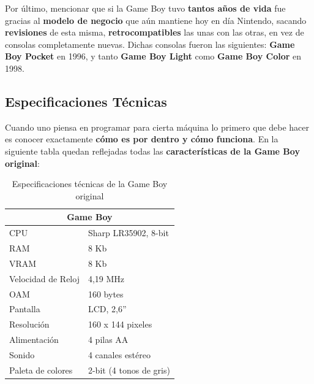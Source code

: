 Por último, mencionar que si la Game Boy tuvo \textbf{tantos años de vida} fue gracias al \textbf{modelo de negocio} que aún mantiene hoy en día Nintendo, sacando \textbf{revisiones} de esta misma, \textbf{retrocompatibles} las unas con las otras, en vez de consolas completamente nuevas. Dichas consolas fueron las siguientes: \textbf{Game Boy Pocket} en 1996, y tanto \textbf{Game Boy Light} como \textbf{Game Boy Color} en 1998.

\subsection{Especificaciones Técnicas}

Cuando uno piensa en programar para cierta máquina lo primero que debe hacer es conocer exactamente \textbf{cómo es por dentro y cómo funciona}. En la siguiente tabla quedan reflejadas todas las \textbf{características de la Game Boy original}:

\begin{table}[h!]
\centering
\begin{tabular}{ |p{3.5cm}|p{3.5cm}| }

\hline

\multicolumn{2}{|c|}{\textbf{Game Boy}}             \\ \hline
CPU                & Sharp LR35902, 8-bit           \\ \hline
RAM                & 8 Kb                           \\ \hline
VRAM               & 8 Kb                           \\ \hline
Velocidad de Reloj & 4,19 MHz                       \\ \hline
OAM                & 160 bytes                      \\ \hline
Pantalla           & LCD, 2,6''                     \\ \hline
Resolución         & 160 x 144 pixeles              \\ \hline
Alimentación       & 4 pilas AA                     \\ \hline
Sonido             & 4 canales estéreo              \\ \hline
Paleta de colores  & 2-bit (4 tonos de gris)        \\ \hline
\end{tabular}

\caption{Especificaciones técnicas de la Game Boy original}

\label{table:1}
\end{table}

